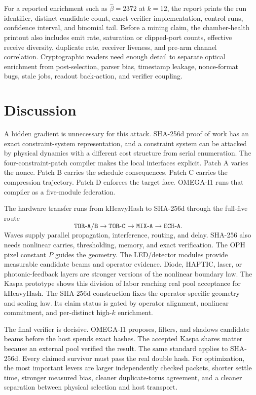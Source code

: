 \documentclass[11pt]{article}
\theoremstyle{definition}
\theoremstyle{remark}
\begin{document}
For a reported enrichment such as \(\widehat\beta=2372\) at \(k=12\), the report
prints the run identifier, distinct candidate count, exact-verifier
implementation, control runs, confidence interval, and binomial tail. Before a
mining claim, the chamber-health printout also includes emit rate,
saturation or clipped-port counts, effective receive diversity, duplicate rate,
receiver liveness, and pre-arm channel correlation. Cryptographic readers need
enough detail to separate optical enrichment from post-selection, parser bias,
timestamp leakage, nonce-format bugs, stale jobs, readout back-action, and
verifier coupling.

\section{Discussion}

A hidden gradient is unnecessary for this attack. SHA-256d proof of work
has an exact constraint-system representation, and a constraint system can be
attacked by physical dynamics with a different cost structure from serial
enumeration. The four-constraint-patch compiler makes the local interfaces explicit.
Patch A varies the nonce. Patch B carries the schedule consequences. Patch C
carries the compression trajectory. Patch D enforces the target face. OMEGA-I1
runs that compiler as a five-module federation.

The hardware transfer runs from kHeavyHash to SHA-256d through the full-five
route
\[
\texttt{TOR-A/B}\to\texttt{TOR-C}\to\texttt{MIX-A}\to\texttt{ECH-A}.
\]
Waves supply parallel propagation, interference, routing, and delay.
SHA-256 also needs nonlinear carries, thresholding, memory, and exact
verification. The OPH pixel constant \(P\) guides the geometry. The
LED/detector modules provide measurable candidate beams and operator evidence.
Diode, HAPTIC, laser, or photonic-feedback layers are stronger versions of the
nonlinear boundary law. The Kaspa prototype shows this division of labor
reaching real pool acceptance for kHeavyHash. The SHA-256d construction fixes
the operator-specific geometry and scaling law. Its claim status is gated by
operator alignment, nonlinear commitment, and per-distinct high-\(k\)
enrichment.

The final verifier is decisive. OMEGA-I1 proposes, filters, and shadows
candidate beams before the host spends exact hashes. The accepted Kaspa shares
matter because an external pool verified the result. The same standard applies
to SHA-256d. Every claimed survivor must pass the real double hash. For
optimization, the most important levers are larger independently checked
packets, shorter settle time, stronger measured bias, cleaner duplicate-torus
agreement, and a cleaner separation between physical selection and host
transport.
\end{document}
